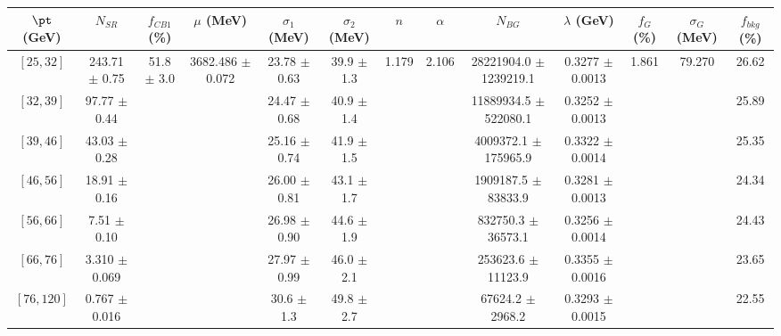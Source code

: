 \begin{tabular}{c||c|c|c|c|c|c|c|c|c|c|c||c}
$\pt$ (GeV) & $N_{SR}$ & $f_{CB1}$ (\%) & $\mu$ (MeV) & $\sigma_1$ (MeV) & $\sigma_2$ (MeV) & $n$ & $\alpha$ & $N_{BG}$ & $\lambda$ (GeV) & $f_G$ (\%) & $\sigma_G$ (MeV) & $f_{bkg}$ (\%) \\
\hline
$[25, 32]$ & 243.71 $\pm$ 0.75 & \multirow{7}{*}{51.8 $\pm$ 3.0} & \multirow{7}{*}{3682.486 $\pm$ 0.072} & 23.78 $\pm$ 0.63 & 39.9 $\pm$ 1.3 & \multirow{7}{*}{1.179} & \multirow{7}{*}{2.106} & 28221904.0 $\pm$ 1239219.1 & 0.3277 $\pm$ 0.0013 & \multirow{7}{*}{1.861} & \multirow{7}{*}{79.270} & 26.62\\
$[32, 39]$ & 97.77 $\pm$ 0.44 &  &  & 24.47 $\pm$ 0.68 & 40.9 $\pm$ 1.4 &  &  & 11889934.5 $\pm$ 522080.1 & 0.3252 $\pm$ 0.0013 &  &  & 25.89\\
$[39, 46]$ & 43.03 $\pm$ 0.28 &  &  & 25.16 $\pm$ 0.74 & 41.9 $\pm$ 1.5 &  &  & 4009372.1 $\pm$ 175965.9 & 0.3322 $\pm$ 0.0014 &  &  & 25.35\\
$[46, 56]$ & 18.91 $\pm$ 0.16 &  &  & 26.00 $\pm$ 0.81 & 43.1 $\pm$ 1.7 &  &  & 1909187.5 $\pm$ 83833.9 & 0.3281 $\pm$ 0.0013 &  &  & 24.34\\
$[56, 66]$ & 7.51 $\pm$ 0.10 &  &  & 26.98 $\pm$ 0.90 & 44.6 $\pm$ 1.9 &  &  & 832750.3 $\pm$ 36573.1 & 0.3256 $\pm$ 0.0014 &  &  & 24.43\\
$[66, 76]$ & 3.310 $\pm$ 0.069 &  &  & 27.97 $\pm$ 0.99 & 46.0 $\pm$ 2.1 &  &  & 253623.6 $\pm$ 11123.9 & 0.3355 $\pm$ 0.0016 &  &  & 23.65\\
$[76, 120]$ & 0.767 $\pm$ 0.016 &  &  & 30.6 $\pm$ 1.3 & 49.8 $\pm$ 2.7 &  &  & 67624.2 $\pm$ 2968.2 & 0.3293 $\pm$ 0.0015 &  &  & 22.55\\
\end{tabular}
